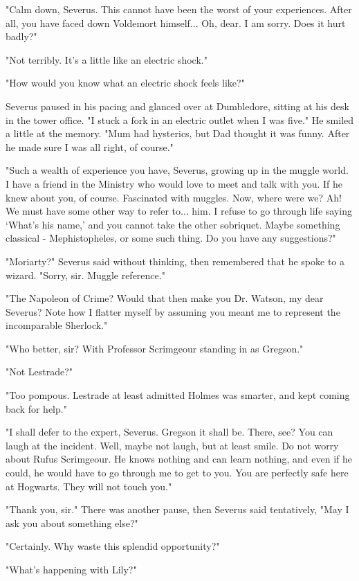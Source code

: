\documentclass[a4paper,11pt]{article}
\begin{document}
"Calm down, Severus. This cannot have been the worst of your experiences. After all, you have faced down Voldemort himself... Oh, dear. I am sorry. Does it hurt badly?"

"Not terribly. It's a little like an electric shock."

"How would you know what an electric shock feels like?"

Severus paused in his pacing and glanced over at Dumbledore, sitting at his desk in the tower office. "I stuck a fork in an electric outlet when I was five." He smiled a little at the memory. "Mum had hysterics, but Dad thought it was funny. After he made sure I was all right, of course."

"Such a wealth of experience you have, Severus, growing up in the muggle world. I have a friend in the Ministry who would love to meet and talk with you. If he knew about you, of course. Fascinated with muggles. Now, where were we? Ah! We must have some other way to refer to... him. I refuse to go through life saying `What's his name,' and you cannot take the other sobriquet. Maybe something classical - Mephistopheles, or some such thing. Do you have any suggestions?"

"Moriarty?" Severus said without thinking, then remembered that he spoke to a wizard. "Sorry, sir. Muggle reference."

"The Napoleon of Crime? Would that then make you Dr. Watson, my dear Severus? Note how I flatter myself by assuming you meant me to represent the incomparable Sherlock."

"Who better, sir? With Professor Scrimgeour standing in as Gregson."

"Not Lestrade?"

"Too pompous. Lestrade at least admitted Holmes was smarter, and kept coming back for help."

"I shall defer to the expert, Severus. Gregson it shall be. There, see? You can laugh at the incident. Well, maybe not laugh, but at least smile. Do not worry about Rufus Scrimgeour. He knows nothing and can learn nothing, and even if he could, he would have to go through me to get to you. You are perfectly safe here at Hogwarts. They will not touch you."

"Thank you, sir." There was another pause, then Severus said tentatively, "May I ask you about something else?"

"Certainly. Why waste this splendid opportunity?"

"What's happening with Lily?"
\end{document}
